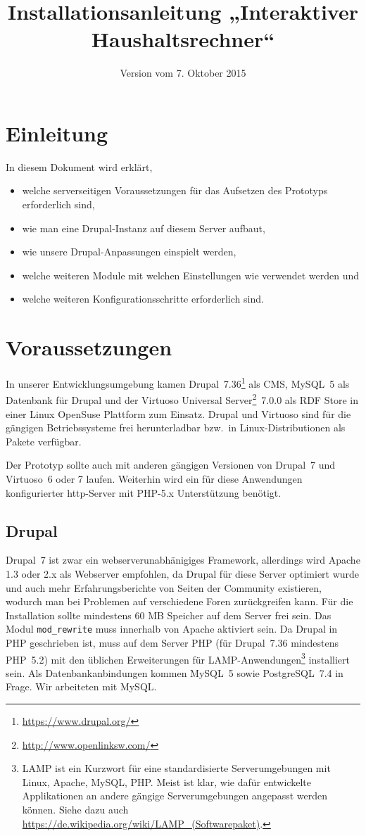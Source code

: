 \documentclass[a4paper,11pt,twoside]{article}
\title{Installationsanleitung „Interaktiver Haushaltsrechner“}
\date{Version vom 7. Oktober 2015}
\begin{document}
\maketitle
\tableofcontents
\newpage
\seitezwei
\newpage

\section{Einleitung}
In diesem Dokument wird erklärt, 
\begin{itemize}\itemsep0pt
\item welche serverseitigen Voraussetzungen für das Aufsetzen des Prototyps
  erforderlich sind, 
\item wie man eine Drupal-Instanz auf diesem Server aufbaut, 
\item wie unsere Drupal-Anpassungen einspielt werden, 
\item welche weiteren Module mit welchen Einstellungen wie verwendet werden und
\item welche weiteren Konfigurationsschritte erforderlich sind.
\end{itemize}

\section{Voraussetzungen}
In unserer Entwicklungsumgebung kamen
Drupal~7.36\footnote{\url{https://www.drupal.org/}} als CMS, MySQL~5 als
Datenbank für Drupal und der Virtuoso Universal
Server\footnote{\url{http://www.openlinksw.com/}}~7.0.0 als RDF Store in einer
Linux OpenSuse Plattform zum Einsatz.  Drupal und Virtuoso sind für die
gängigen Betriebssysteme frei herunterladbar bzw.\ in Linux-Distributionen als
Pakete verfügbar.

Der Prototyp sollte auch mit anderen gängigen Versionen von Drupal~7 und
Virtuoso~6 oder 7 laufen.  Weiterhin wird ein für diese Anwendungen
konfigurierter http-Server mit PHP-5.x Unterstützung benötigt.

\subsection{Drupal}

Drupal~7 ist zwar ein webserverunabhänigiges Framework, allerdings wird Apache
1.3 oder 2.x als Webserver empfohlen, da Drupal für diese Server optimiert
wurde und auch mehr Erfahrungsberichte von Seiten der Community existieren,
wodurch man bei Problemen auf verschiedene Foren zurückgreifen kann. Für die
Installation sollte mindestens 60 MB Speicher auf dem Server frei sein. Das
Modul \texttt{mod\_rewrite} muss innerhalb von Apache aktiviert sein. Da Drupal
in PHP geschrieben ist, muss auf dem Server PHP (für Drupal~7.36 mindestens
PHP~5.2) mit den üblichen Erweiterungen für LAMP-Anwendungen\footnote{LAMP ist
  ein Kurzwort für eine standardisierte Serverumgebungen mit Linux, Apache,
  MySQL, PHP.  Meist ist klar, wie dafür entwickelte Applikationen an andere
  gängige Serverumgebungen angepasst werden können. Siehe dazu auch
  \url{https://de.wikipedia.org/wiki/LAMP_(Softwarepaket)}.}  installiert
sein. Als Datenbankanbindungen kommen MySQL~5 sowie PostgreSQL~7.4 in
Frage. Wir arbeiteten mit MySQL.
\end{document}
